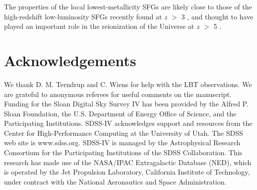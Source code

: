 \documentclass[useAMS,usenatbib]{mn2e}
\begin{document}
The properties of the local lowest-metallicity SFGs are likely close to those 
of the high-redshift low-luminosity SFGs recently found at $z$ $>$ 3
\citep{K17}, and thought to have played an important role in the 
reionization of the Universe at $z$ $>$ 5 \citep{O09}.




\section*{Acknowledgements}

We thank D. M. Terndrup and C. Wiens for help with the LBT observations.
We are grateful to anonymous referees for useful comments on the manuscript.
Funding for the Sloan Digital Sky Survey IV has been provided by
the Alfred P. Sloan Foundation, the U.S. Department of Energy Office of
Science, and the Participating Institutions. SDSS-IV acknowledges
support and resources from the Center for High-Performance Computing at
the University of Utah. The SDSS web site is www.sdss.org.
SDSS-IV is managed by the Astrophysical Research Consortium for the 
Participating Institutions of the SDSS Collaboration. 
This research has made use of the NASA/IPAC Extragalactic Database (NED), which 
is operated by the Jet Propulsion Laboratory, California Institute of 
Technology, under contract with the National Aeronautics and Space 
Administration.





\bsp

\label{lastpage}
\end{document}
